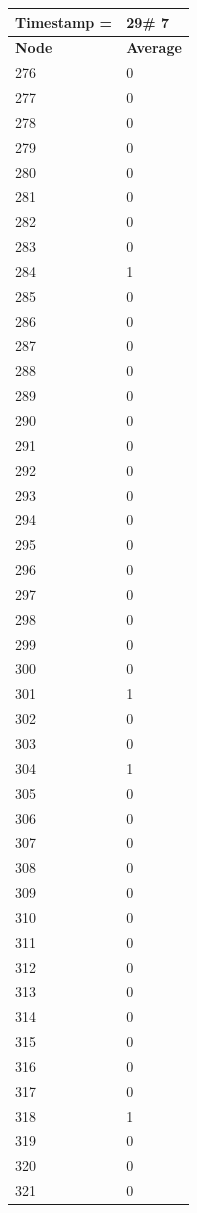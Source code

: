 \begin{tabular}{|l||l|}
\hline
\textbf{Timestamp =} & \textbf{29}\# 7\\\hline
	\textbf{Node} & \textbf{Average} \\ \hline
\hline
	276 & 0 \\ \hline
	277 & 0 \\ \hline
	278 & 0 \\ \hline
	279 & 0 \\ \hline
	280 & 0 \\ \hline
	281 & 0 \\ \hline
	282 & 0 \\ \hline
	283 & 0 \\ \hline
	284 & 1 \\ \hline
	285 & 0 \\ \hline
	286 & 0 \\ \hline
	287 & 0 \\ \hline
	288 & 0 \\ \hline
	289 & 0 \\ \hline
	290 & 0 \\ \hline
	291 & 0 \\ \hline
	292 & 0 \\ \hline
	293 & 0 \\ \hline
	294 & 0 \\ \hline
	295 & 0 \\ \hline
	296 & 0 \\ \hline
	297 & 0 \\ \hline
	298 & 0 \\ \hline
	299 & 0 \\ \hline
	300 & 0 \\ \hline
	301 & 1 \\ \hline
	302 & 0 \\ \hline
	303 & 0 \\ \hline
	304 & 1 \\ \hline
	305 & 0 \\ \hline
	306 & 0 \\ \hline
	307 & 0 \\ \hline
	308 & 0 \\ \hline
	309 & 0 \\ \hline
	310 & 0 \\ \hline
	311 & 0 \\ \hline
	312 & 0 \\ \hline
	313 & 0 \\ \hline
	314 & 0 \\ \hline
	315 & 0 \\ \hline
	316 & 0 \\ \hline
	317 & 0 \\ \hline
	318 & 1 \\ \hline
	319 & 0 \\ \hline
	320 & 0 \\ \hline
	321 & 0 \\ \hline
\end{tabular}
